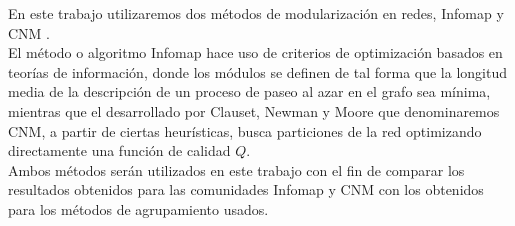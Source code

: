En este trabajo utilizaremos dos métodos de modularización en redes, Infomap \cite{Rosvall2008} y CNM \cite{Clauset2004}.\\
El método o algoritmo Infomap hace uso de criterios de optimización basados en teorías de información, donde los módulos se definen de tal forma que la longitud media de la descripción de un proceso de paseo al azar en el grafo sea mínima, mientras que el desarrollado por Clauset, Newman y Moore que denominaremos CNM, a partir de ciertas heurísticas, busca particiones de la red optimizando directamente una función de calidad $Q$.\\
Ambos métodos serán utilizados en este trabajo con el fin de comparar los resultados obtenidos para las comunidades Infomap y CNM con los obtenidos para los métodos de agrupamiento usados.\cite{Berenstein2014, Rosvall2008}\\
